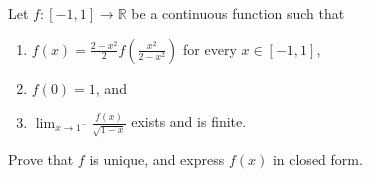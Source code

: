 Let $f:[-1,1]\to\mathbb{R}$ be a continuous function such that
\begin{enumerate}[label=(\roman*)]
	\item $f(x)=\frac{2-x^2}{2}f\left(\frac{x^2}{2-x^2}\right)$ for every $x\in[-1,1]$,
	\item $f(0)=1$, and
	\item $\displaystyle\lim_{x\to1^-}\frac{f(x)}{\sqrt{1-x}}$ exists and is finite.
\end{enumerate}
Prove that $f$ is unique, and express $f(x)$ in closed form.